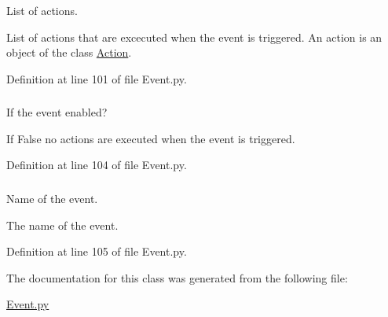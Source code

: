 List of actions. 

List of actions that are excecuted when the event is triggered. An action is an object of the class \hyperlink{class_event_1_1_action}{Action}. 

Definition at line 101 of file Event.py.

\hypertarget{class_event_1_1_event_a265d75b269c4b7925eada6a68dd9490f}{
\subsubsection[{\_\-\_\-enabled}]{}}
\label{class_event_1_1_event_a265d75b269c4b7925eada6a68dd9490f}


If the event enabled? 

If False no actions are executed when the event is triggered. 

Definition at line 104 of file Event.py.

\hypertarget{class_event_1_1_event_a6b410ecc97e65ec2003daeb67b1a9c60}{
\subsubsection[{name}]{}}
\label{class_event_1_1_event_a6b410ecc97e65ec2003daeb67b1a9c60}


Name of the event. 

The name of the event. 

Definition at line 105 of file Event.py.



The documentation for this class was generated from the following file:\begin{DoxyCompactItemize}
\item 
\hyperlink{_event_8py}{Event.py}\end{DoxyCompactItemize}
